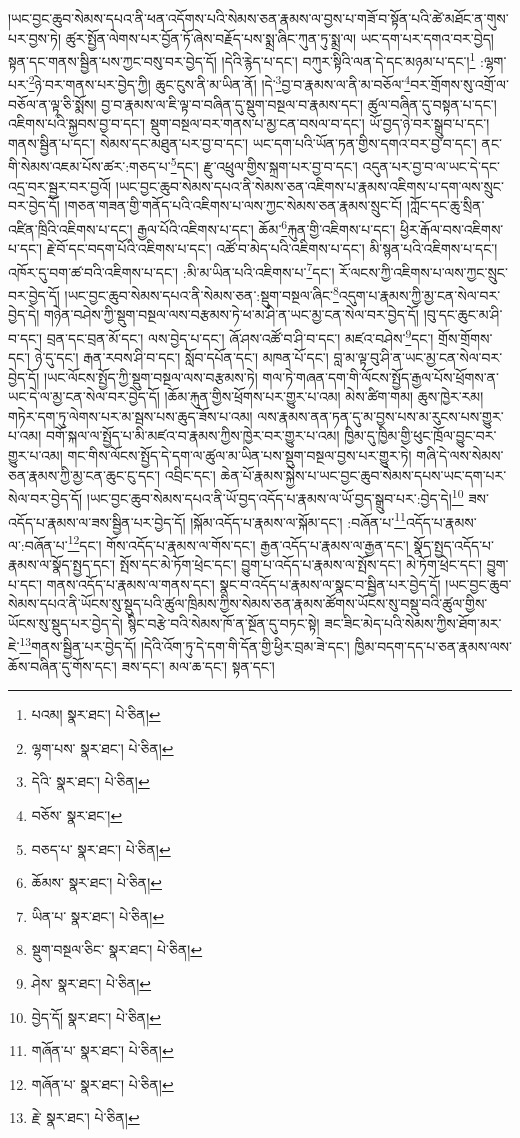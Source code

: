 །ཡང་བྱང་ཆུབ་སེམས་དཔའ་ནི་ཕན་འདོགས་པའི་སེམས་ཅན་རྣམས་ལ་བྱས་པ་གཟོ་བ་སྟོན་པའི་ཚེ་མཐོང་ན་གུས་པར་བྱས་ཏེ། ཚུར་སྤྱོན་ལེགས་པར་བྱོན་ཏོ་ཞེས་བརྗོད་པས་སྨྲ་ཞིང་ཀུན་ཏུ་སྨྲ་ལ། ཡང་དག་པར་དགའ་བར་བྱེད། སྟན་དང་གནས་སྦྱིན་པས་ཀྱང་བསུ་བར་བྱེད་དོ། །དེའི་རྙེད་པ་དང་། བཀུར་སྟིའི་ལན་དེ་དང་མཉམ་པ་དང་།\footnote{པའམ།  སྣར་ཐང་།  པེ་ཅིན། } :ལྷག་པར་\footnote{ལྷག་པས་  སྣར་ཐང་།  པེ་ཅིན། }ཉེ་བར་གནས་པར་བྱེད་ཀྱི། ཆུང་ངུས་ནི་མ་ཡིན་ནོ། །དེ་\footnote{དེའི་  སྣར་ཐང་།  པེ་ཅིན། }བྱ་བ་རྣམས་ལ་ནི་མ་བཅོལ་\footnote{བཅོས་  སྣར་ཐང་། }བར་གྲོགས་སུ་འགྲོ་ལ་བཅོལ་ན་ལྟ་ཅི་སྨོས། བྱ་བ་རྣམས་ལ་ཇི་ལྟ་བ་བཞིན་དུ་སྡུག་བསྔལ་བ་རྣམས་དང་། ཚུལ་བཞིན་དུ་བསྟན་པ་དང་། འཇིགས་པའི་སྐྱབས་བྱ་བ་དང་། སྡུག་བསྔལ་བར་གནས་པ་མྱ་ངན་བསལ་བ་དང་། ཡོ་བྱད་ཉེ་བར་སྒྲུབ་པ་དང་། གནས་སྦྱིན་པ་དང་། སེམས་དང་མཐུན་པར་བྱ་བ་དང་། ཡང་དག་པའི་ཡོན་ཏན་གྱིས་དགའ་བར་བྱ་བ་དང་། ནང་གི་སེམས་འཇམ་པོས་ཚར་:གཅད་པ་\footnote{བཅད་པ་  སྣར་ཐང་།  པེ་ཅིན། }དང་། རྫུ་འཕྲུལ་གྱིས་སྐྲག་པར་བྱ་བ་དང་། འདུན་པར་བྱ་བ་ལ་ཡང་དེ་དང་འདྲ་བར་སྦྱར་བར་བྱའོ། །ཡང་བྱང་ཆུབ་སེམས་དཔའ་ནི་སེམས་ཅན་འཇིགས་པ་རྣམས་འཇིགས་པ་དག་ལས་སྲུང་བར་བྱེད་དོ། །གཅན་གཟན་གྱི་གནོད་པའི་འཇིགས་པ་ལས་ཀྱང་སེམས་ཅན་རྣམས་སྲུང་ངོ། །ཀློང་དང་ཆུ་སྲིན་འཛིན་ཁྲིའི་འཇིགས་པ་དང་། རྒྱལ་པོའི་འཇིགས་པ་དང་། ཆོམ་\footnote{ཆོམས་  སྣར་ཐང་།  པེ་ཅིན། }རྐུན་གྱི་འཇིགས་པ་དང་། ཕྱིར་རྒོལ་བས་འཇིགས་པ་དང་། རྗེ་བོ་དང་བདག་པོའི་འཇིགས་པ་དང་། འཚོ་བ་མེད་པའི་འཇིགས་པ་དང་། མི་སྙན་པའི་འཇིགས་པ་དང་། འཁོར་དུ་བག་ཚ་བའི་འཇིགས་པ་དང་། :མི་མ་ཡིན་པའི་འཇིགས་པ་\footnote{ཡིན་པ་  སྣར་ཐང་།  པེ་ཅིན། }དང་། རོ་ལངས་ཀྱི་འཇིགས་པ་ལས་ཀྱང་སྲུང་བར་བྱེད་དོ། །ཡང་བྱང་ཆུབ་སེམས་དཔའ་ནི་སེམས་ཅན་:སྡུག་བསྔལ་ཞིང་\footnote{སྡུག་བསྔལ་ཅིང་  སྣར་ཐང་།  པེ་ཅིན། }འདུག་པ་རྣམས་ཀྱི་མྱ་ངན་སེལ་བར་བྱེད་དེ། གཉེན་བཤེས་ཀྱི་སྡུག་བསྔལ་ལས་བརྩམས་ཏེ་ཕ་མ་ཤི་ན་ཡང་མྱ་ངན་སེལ་བར་བྱེད་དོ། །བུ་དང་ཆུང་མ་ཤི་བ་དང་། བྲན་དང་བྲན་མོ་དང་། ལས་བྱེད་པ་དང་། ཞོ་ཤས་འཚོ་བ་ཤི་བ་དང་། མཛའ་བཤེས་\footnote{ཤེས་  སྣར་ཐང་།  པེ་ཅིན། }དང་། གྲོས་གྲོགས་དང་། ཉེ་དུ་དང་། རྒན་རབས་ཤི་བ་དང་། སློབ་དཔོན་དང་། མཁན་པོ་དང་། བླ་མ་ལྟ་བུ་ཤི་ན་ཡང་མྱ་ངན་སེལ་བར་བྱེད་དོ། །ཡང་ལོངས་སྤྱོད་ཀྱི་སྡུག་བསྔལ་ལས་བརྩམས་ཏེ། གལ་ཏེ་གཞན་དག་གི་ལོངས་སྤྱོད་རྒྱལ་པོས་ཕྲོགས་ན་ཡང་དེ་ལ་མྱ་ངན་སེལ་བར་བྱེད་དོ། །ཆོམ་རྐུན་གྱིས་ཕྲོགས་པར་གྱུར་པ་འམ། མེས་ཚིག་གམ། ཆུས་ཁྱེར་རམ། གཏེར་དག་ཏུ་ལེགས་པར་མ་སྦས་པས་ཆུད་ཟོས་པ་འམ། ལས་རྣམས་ནན་ཏན་དུ་མ་བྱས་པས་མ་རུངས་པས་གྱུར་པ་འམ། བགོ་སྐལ་ལ་སྤྱོད་པ་མི་མཛའ་བ་རྣམས་ཀྱིས་ཁྱེར་བར་གྱུར་པ་འམ། ཁྱིམ་དུ་ཁྱིམ་གྱི་ཕུང་ཁྲོལ་བྱུང་བར་གྱུར་པ་འམ། གང་གིས་ལོངས་སྤྱོད་དེ་དག་ལ་ཚུལ་མ་ཡིན་པས་སྡུག་བསྔལ་བྱས་པར་གྱུར་ཏེ། གཞི་དེ་ལས་སེམས་ཅན་རྣམས་ཀྱི་མྱ་ངན་ཆུང་ངུ་དང་། འབྲིང་དང་། ཆེན་པོ་རྣམས་སྐྱེས་པ་ཡང་བྱང་ཆུབ་སེམས་དཔས་ཡང་དག་པར་སེལ་བར་བྱེད་དོ། །ཡང་བྱང་ཆུབ་སེམས་དཔའ་ནི་ཡོ་བྱད་འདོད་པ་རྣམས་ལ་ཡོ་བྱད་སྒྲུབ་པར་:བྱེད་དེ།\footnote{བྱེད་དོ།  སྣར་ཐང་།  པེ་ཅིན། } ཟས་འདོད་པ་རྣམས་ལ་ཟས་སྦྱིན་པར་བྱེད་དོ། །སྐོམ་འདོད་པ་རྣམས་ལ་སྐོམ་དང་། :བཞོན་པ་\footnote{གཞོན་པ་  སྣར་ཐང་།  པེ་ཅིན། }འདོད་པ་རྣམས་ལ་:བཞོན་པ་\footnote{གཞོན་པ་  སྣར་ཐང་།  པེ་ཅིན། }དང་། གོས་འདོད་པ་རྣམས་ལ་གོས་དང་། རྒྱན་འདོད་པ་རྣམས་ལ་རྒྱན་དང་། སྣོད་སྤྱད་འདོད་པ་རྣམས་ལ་སྣོད་སྤྱད་དང་། སྤོས་དང་མེ་ཏོག་ཕྲེང་དང་། བྱུག་པ་འདོད་པ་རྣམས་ལ་སྤོས་དང་། མེ་ཏོག་ཕྲེང་དང་། བྱུག་པ་དང་། གནས་འདོད་པ་རྣམས་ལ་གནས་དང་། སྣང་བ་འདོད་པ་རྣམས་ལ་སྣང་བ་སྦྱིན་པར་བྱེད་དོ། །ཡང་བྱང་ཆུབ་སེམས་དཔའ་ནི་ཡོངས་སུ་སྡུད་པའི་ཚུལ་ཁྲིམས་ཀྱིས་སེམས་ཅན་རྣམས་ཚོགས་ཡོངས་སུ་བསྡུ་བའི་ཚུལ་གྱིས་ཡོངས་སུ་སྡུད་པར་བྱེད་དེ། སྙིང་བརྩེ་བའི་སེམས་ཁོ་ན་སྔོན་དུ་བཏང་སྟེ། ཟང་ཟིང་མེད་པའི་སེམས་ཀྱིས་ཐོག་མར་ཇེ་\footnote{རྗེ་  སྣར་ཐང་།  པེ་ཅིན། }གནས་སྦྱིན་པར་བྱེད་དོ། །དེའི་འོག་ཏུ་དེ་དག་གི་དོན་གྱི་ཕྱིར་བྲམ་ཟེ་དང་། ཁྱིམ་བདག་དད་པ་ཅན་རྣམས་ལས་ཆོས་བཞིན་དུ་གོས་དང་། ཟས་དང་། མལ་ཆ་དང་། སྟན་དང་། 
